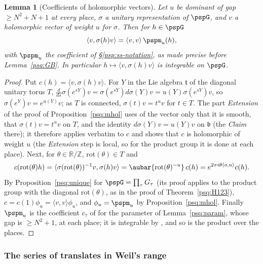 \documentclass[10pt]{amsart}
\newtheorem{lemma}[theorem]{Lemma}
\theoremstyle{definition}
\theoremstyle{remark}
\newcommand{\R}{\mathbb R}
\newcommand{\Z}{\mathbb Z}
\begin{document}
\begin{lemma}[Coefficients of holomorphic vectors]\label{psr:coef}
Let $u$ be dominant of gap $\ge N^2+N+1$ at every place, $\sigma$ a unitary representation of
$\pspG$, and $v$ a holomorphic vector of weight $u$ for $\sigma$. Then for $h\in\pspG$
\[
\langle v,\sigma(h)v\rangle=\langle v,v\rangle\,\pspm_u(h),
\]
with $\pspm_u$ the coefficient of \S\ref{psp:ss-notation}, as made precise before
Lemma~\ref{psq:GB}. In particular $h\mapsto\langle v,\sigma(h)v\rangle$ is integrable on $\pspG$.
\end{lemma}
\begin{proof}
Put $c(h)=\langle v,\sigma(h)v\rangle$. For $Y$ in the Lie algebra $\mathfrak t$ of the diagonal
unitary torus $T$, $\frac d{ds}\sigma(e^{sY})v=\sigma(e^{sY})d\sigma(Y)v=u(Y)\sigma(e^{sY})v$, so
$\sigma(e^Y)v=e^{u(Y)}v$; as $T$ is connected, $\sigma(t)v=t^uv$ for $t\in T$. The part
\emph{Extension} of the proof of Proposition~\ref{psq:mhol} uses of the vector only that it is smooth,
that $\sigma(t)v=t^uv$ on $T$, and the identity $d\sigma(Y)v=u(Y)v$ on $\mathfrak b$ (the
\emph{Claim} there); it therefore applies verbatim to $c$ and shows that $c$ is holomorphic of weight
$u$ (the \emph{Extension} step is local, so for the product group it is done at each place). Next, for
$\theta\in\R/\Z$, $\mathrm{rot}(\theta)\in T$ and
\[
c(\mathrm{rot}(\theta)h)=\langle\sigma(\mathrm{rot}(\theta))^{-1}v,\sigma(h)v\rangle=
\aubar{\mathrm{rot}(\theta)^{-u}}\,c(h)=e^{2\pi i\theta\langle o,u\rangle}c(h).
\]
By Proposition~\ref{psq:unique} for $\pspG=\prod_\tau G_\tau$ (its proof applies to the product group with the diagonal $\mathrm{rot}(\theta)$, as in the proof of Theorem~\ref{psq:H123}), $c=c(1)\phi_u=\langle v,v\rangle\phi_u$, and $\phi_u=\pspm_u$ by
Proposition~\ref{psq:mhol}. Finally $\pspm_u$ is the coefficient $c_\tau$ of {\cite[\S5]{P51}} for the
parameter of Lemma~\ref{psq:param}, whose gap is $\ge N^2+1$, at each place; it is integrable by
{\cite[Theorem~5.9]{P51}}, and so is the product over the places.
\end{proof}

\subsubsection{The series of translates in Weil's range}\label{psr:ss-series}
\end{document}

